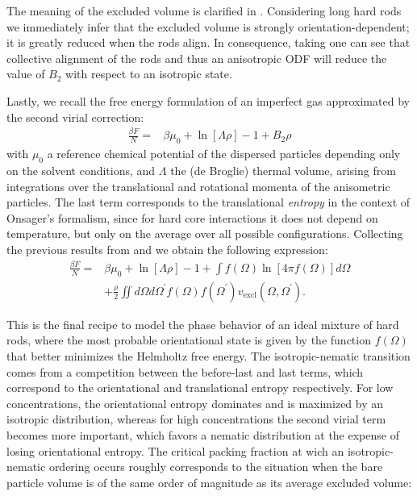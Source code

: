 The meaning of the excluded volume is clarified in . Considering long hard rods we immediately infer that the excluded volume is strongly orientation-dependent; it is greatly reduced when the rods align. In consequence, taking  one can see that collective alignment of the rods and thus an anisotropic ODF will reduce the value of $B_2$ with respect to an isotropic state.

Lastly, we recall the free energy formulation of an imperfect gas approximated by the second virial correction:
\begin{align}
\frac{\beta F}{N} =& \beta \mu_{0}+\ln\left[\Lambda\rho\right]-1+ B_2 \rho
\end{align}
with $\mu_{0}$ a reference chemical potential of the dispersed particles depending only on the solvent conditions, and $\Lambda$ the (de Broglie) thermal volume, arising from
integrations over the translational and rotational momenta of the anisometric particles. The last term corresponds to the translational {\em entropy} in the context of Onsager's formalism, since for hard core interactions it does not depend on temperature, but only on the average over all possible configurations. Collecting the previous results from  and  we obtain the following expression:
\begin{align}
\frac{\beta F}{N} =& \beta \mu_{0}+\ln\left[\Lambda\rho\right]-1+
\int f(\Omega)\ln \left[4\pi f(\Omega)\right]d\Omega \nonumber \\
&+\frac{\rho}{2} \iint d\Omega d\Omega^{\prime}
f(\Omega)f(\Omega^{\prime})v_{\text{excl}}(\Omega,\Omega^{\prime}). \label{0freetot}
\end{align}

This is the final recipe to model the phase behavior of an ideal mixture of hard rods, where the most probable orientational state is given by the function $f(\Omega)$ that better minimizes the Helmholtz free energy. The isotropic-nematic transition comes from a competition between the before-last and last terms, which correspond to the orientational and translational entropy respectively. For low concentrations, the orientational entropy dominates and is maximized by an isotropic distribution, whereas for high concentrations the second virial term becomes more important, which favors a nematic distribution at the expense of losing orientational entropy. The critical packing fraction at wich an isotropic-nematic ordering occurs roughly corresponds to the situation when the bare particle volume is of the same order of magnitude as its average excluded volume:


